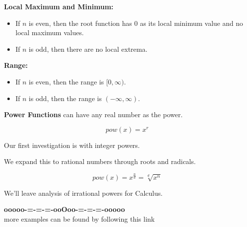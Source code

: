 \documentclass{ximera}
\begin{document}
\begin{explanation}
\textbf{Local Maximum and Minimum:} 


\begin{itemize}
\item If $n$ is even, then the root function has $0$ as its local minimum value and no local maximum values.
\item If $n$ is odd, then there are no local extrema.
\end{itemize} 


\textbf{Range:} 


\begin{itemize}
\item If $n$ is even, then the range is $[0, \infty)$.
\item If $n$ is odd, then the range is $(-\infty, \infty)$.
\end{itemize} 

\end{explanation}




\textbf{Power Functions} can have any real number as the power.


\[  pow(x) = x^r  \]

Our first investigation is with integer powers.

We expand this to rational numbers through roots and radicals.

\[ pow(x) = x^{\tfrac{n}{d}} = \sqrt[d]{x^n}  \]

We'll leave analysis of irrational powers for Calculus.

























































\begin{center}
\textbf{\textcolor{green!50!black}{ooooo-=-=-=-ooOoo-=-=-=-ooooo}} \\

more examples can be found by following this link\\ 

\end{center}
\end{document}
